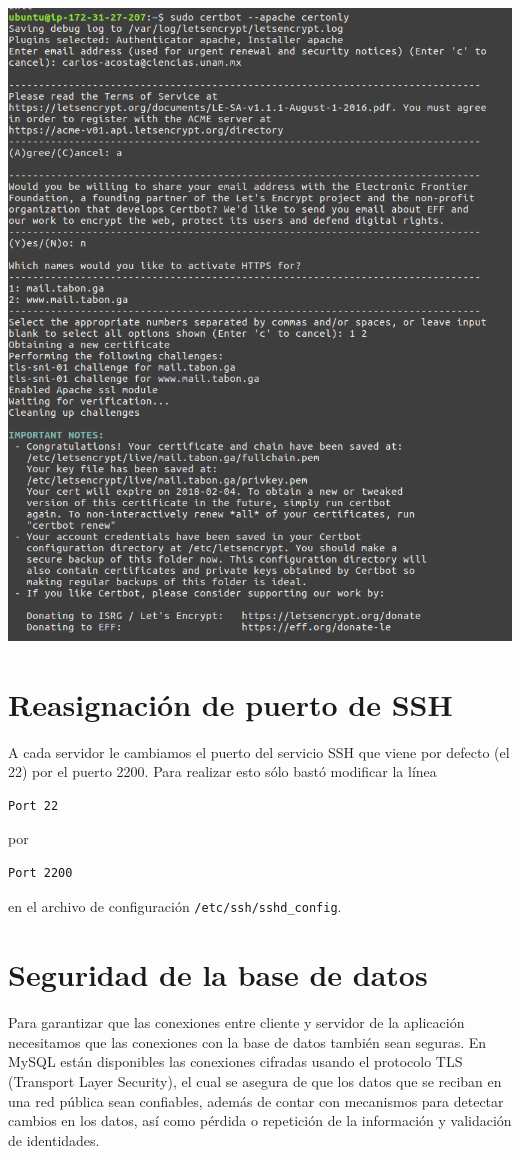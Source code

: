 \documentclass[9pt]{article}
\begin{document}
\begin{center}
\includegraphics[scale=0.3]{mail/2}
\end{center}

\section{Reasignación de puerto de SSH}
A cada servidor le cambiamos el puerto del servicio \textsf{SSH} que viene por defecto (el 22) por el puerto 2200. Para realizar esto sólo bastó modificar la línea
\begin{verbatim}
Port 22
\end{verbatim}
por
\begin{verbatim}
Port 2200
\end{verbatim}
en el archivo de configuración \texttt{/etc/ssh/sshd\_config}.

\section{Seguridad de la base de datos}
Para garantizar que las conexiones entre cliente y servidor de la aplicación necesitamos que las conexiones con la base de datos también sean seguras. En \textsf{MySQL} están disponibles las conexiones cifradas usando el protocolo \textsf{TLS} (Transport Layer Security), el cual se asegura de que los datos que se reciban en una red pública sean confiables, además de contar con mecanismos para detectar cambios en los datos, así como pérdida o repetición de la información y validación de identidades. \\
\end{document}

